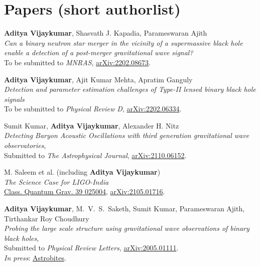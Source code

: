 \section{Papers (short authorlist)}
\begin{etaremune}
	\item 
	\textbf{Aditya Vijaykumar}, Shasvath J. Kapadia, Parameswaran Ajith\\
	\textit{Can a binary neutron star merger in the vicinity of a supermassive black hole enable a detection of a post-merger gravitational wave signal?}\\
	To be submitted to \textit{MNRAS}, \href{https://arxiv.org/abs/2202.08673}{arXiv:2202.08673}.
	
	\item \textbf{Aditya Vijaykumar}, Ajit Kumar Mehta, Apratim Ganguly\\
	\textit{Detection and parameter estimation challenges of Type-II lensed binary black hole signals}\\
	To be submitted to \textit{Physical Review D}, \href{https://arxiv.org/abs/2202.06334}{arXiv:2202.06334}.

	\item 
	Sumit Kumar, \textbf{Aditya Vijaykumar}, Alexander H. Nitz\\
	\textit{Detecting Baryon Acoustic Oscillations with third generation gravitational wave observatories},\\
	Submitted to \textit{The Astrophysical Journal}, \href{https://arxiv.org/abs/2110.06152}{arXiv:2110.06152}.

	\item M. Saleem et al. (including \textbf{Aditya Vijaykumar})\\
	\textit{The Science Case for LIGO-India}\\
	\href{https://iopscience.iop.org/article/10.1088/1361-6382/ac3b99}{Class. Quantum Grav. 39 025004}, \href{https://arxiv.org/abs/2105.01716}{arXiv:2105.01716}.
	
	\item 
	\textbf{Aditya Vijaykumar}, M.~V.~S.~Saketh, Sumit Kumar, Parameswaran Ajith, Tirthankar Roy Choudhury\\
	\textit{Probing the large scale structure using gravitational wave observations of binary black holes},\\
	Submitted to \textit{Physical Review Letters}, \href{https://arxiv.org/abs/2005.01111}{arXiv:2005.01111}.\\
	\textit{In press}: \href{https://astrobites.org/2020/05/07/binary-black-holes-tangled-up-in-the-cosmic-web/}{Astrobites}.
	

\end{etaremune}
